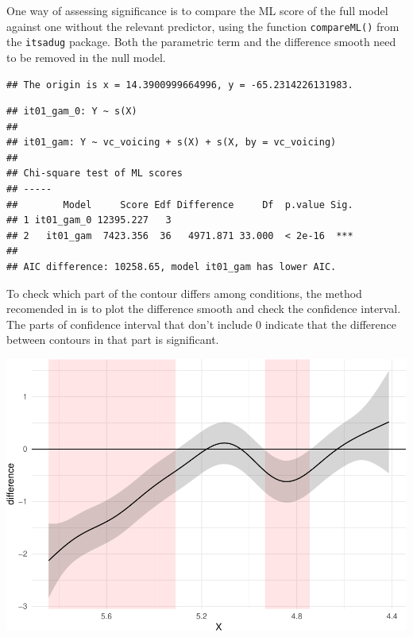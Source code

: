 \documentclass[12pt,]{article}
\begin{document}
One way of assessing significance is to compare the ML score of the full
model against one without the relevant predictor, using the function
\texttt{compareML()} from the \texttt{itsadug} package. Both the
parametric term and the difference smooth need to be removed in the null
model.

\begin{verbatim}
## The origin is x = 14.3900999664996, y = -65.2314226131983.
\end{verbatim}

\begin{verbatim}
## it01_gam_0: Y ~ s(X)
## 
## it01_gam: Y ~ vc_voicing + s(X) + s(X, by = vc_voicing)
## 
## Chi-square test of ML scores
## -----
##        Model     Score Edf Difference     Df  p.value Sig.
## 1 it01_gam_0 12395.227   3                                
## 2   it01_gam  7423.356  36   4971.871 33.000  < 2e-16  ***
## 
## AIC difference: 10258.65, model it01_gam has lower AIC.
\end{verbatim}

To check which part of the contour differs among conditions, the method
recomended in \citet{soskuthy2017} is to plot the difference smooth and
check the confidence interval. The parts of confidence interval that
don't include 0 indicate that the difference between contours in that
part is significant.

\begin{center}\includegraphics{2018-polar-gam_files/figure-latex/diff-it01-a-1} \end{center}
\end{document}
